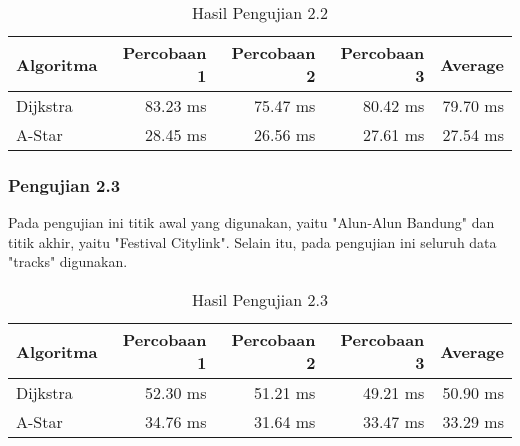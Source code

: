 \begin{table}[H]
\centering
\caption{Hasil Pengujian 2.2}
\label{tab:hasiluji2.2}
{\large
\begin{tabular}{|l|r|r|r|r|}
\hline
\textbf{Algoritma} & \textbf{Percobaan 1} & \textbf{Percobaan 2} & \textbf{Percobaan 3} & {\textbf{Average}}\\ \hline
Dijkstra           & 83.23 ms              & 75.47 ms             & 80.42 ms       &       79.70 ms       \\ \hline
A-Star            & 28.45 ms              & 26.56 ms              & 27.61 ms      &      27.54 ms       \\ \hline
\end{tabular}
}
\end{table}

\subsubsection{Pengujian 2.3}
Pada pengujian ini titik awal yang digunakan, yaitu "Alun-Alun Bandung" dan titik akhir, yaitu "Festival Citylink". Selain itu, pada pengujian ini seluruh data "tracks" digunakan.

\begin{table}[H]
\centering
\caption{Hasil Pengujian 2.3}
\label{tab:hasiluji2.3}
{\large
\begin{tabular}{|l|r|r|r|r|}
\hline
\textbf{Algoritma} & \textbf{Percobaan 1} & \textbf{Percobaan 2} & \textbf{Percobaan 3} & \multicolumn{1}{l|}{\textbf{Average}}\\ \hline
Dijkstra           & 52.30 ms              & 51.21 ms             & 49.21 ms      &     50.90 ms        \\ \hline
A-Star            & 34.76 ms              & 31.64 ms              & 33.47 ms      &     33.29 ms        \\ \hline
\end{tabular}
}
\end{table}
\newpage
